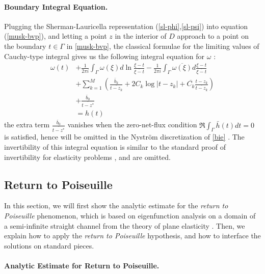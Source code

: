 \documentclass[10pt,twocolumn]{article}
\begin{document}
\paragraph*{Boundary Integral Equation.} 
Plugging the Sherman-Lauricella representation (\ref{sl-phi},\ref{sl-psi}) into equation (\ref{musk-bvp}), 
and letting a point $z$ in the interior of $D$ approach to a point on the boundary $t\in \Gamma$ in \eqref{musk-bvp}, 
the classical formulae for the limiting values of Cauchy-type integral 
gives us the following integral equation for $\omega$ \cite{muschelisviliSingularIntegralEquations1972,greengardIntegralEquationMethods1996}:
\begin{align}
  \omega(t) 
  &+ \frac 1{2\pi i} \int_{\Gamma} \omega(\xi) d\ln \frac{\xi - t}{\overline{\xi - t}} - \frac 1{2\pi i} \int_\Gamma \overline{\omega(\xi)} d \frac{\xi - t}{\overline{\xi - t}} \label{bie} \\
  &+ \sum_{k=1}^M \left( \frac{\bar b_k}{\overline{t- z_k}} +  2C_k \log |t-z_k| + \overline{C_k} \frac{t-z_k}{\overline{ t - z_k}} \right) \nonumber\\
  &+ \frac{\overline b_0}{\overline{ t - z^*}} \nonumber \\
  &= h(t) \nonumber
\end{align}
the extra term $\frac{\overline b_0}{\overline{t - z^*}}$ vanishes when the zero-net-flux condition $\Re \int_\Gamma \bar h(t) dt = 0$ is satisfied, hence will be omitted in the Nystr\"om discretization of \eqref{bie} . 
The invertibility of this integral equation is similar 
to the standard proof of invertibility for elasticity problems \cite{muskhelishviliBasicProblemsMathematical1977}, and are omitted.

\subsection{Return to Poiseuille\label{sec:ret2poi}} 

In this section, we will first show the analytic estimate for the \textit{return to Poiseuille} phenomenon,
which is based on eigenfunction analysis on a domain of a semi-infinite straight channel from the theory of plane elasticity 
\cite{gregoryTractionBoundaryValue1980}. 
Then, we explain how to apply the \textit{return to Poiseuille} hypothesis, 
and how to interface the solutions on standard pieces. 


\paragraph*{Analytic Estimate for Return to Poiseuille. }
\end{document}
